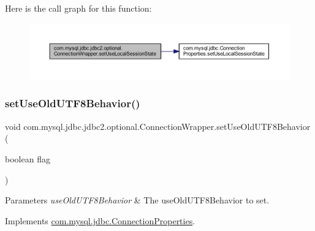 Here is the call graph for this function\+:
\nopagebreak
\begin{figure}[H]
\begin{center}
\leavevmode
\includegraphics[width=350pt]{classcom_1_1mysql_1_1jdbc_1_1jdbc2_1_1optional_1_1_connection_wrapper_aad66241cb376c51b566660d1027e6b14_cgraph}
\end{center}
\end{figure}
\mbox{\label{classcom_1_1mysql_1_1jdbc_1_1jdbc2_1_1optional_1_1_connection_wrapper_aa0de2a1679fb6e3d601d2bd55607d60a}} 
\subsubsection{\texorpdfstring{set\+Use\+Old\+U\+T\+F8\+Behavior()}{setUseOldUTF8Behavior()}}
{\footnotesize\ttfamily void com.\+mysql.\+jdbc.\+jdbc2.\+optional.\+Connection\+Wrapper.\+set\+Use\+Old\+U\+T\+F8\+Behavior (\begin{DoxyParamCaption}\item[{boolean}]{flag }\end{DoxyParamCaption})}


\begin{DoxyParams}{Parameters}
{\em use\+Old\+U\+T\+F8\+Behavior} & The use\+Old\+U\+T\+F8\+Behavior to set. \\
\hline
\end{DoxyParams}


Implements \mbox{\hyperlink{interfacecom_1_1mysql_1_1jdbc_1_1_connection_properties_a0ae502be4bb0e0dca960587d7883a663}{com.\+mysql.\+jdbc.\+Connection\+Properties}}.

